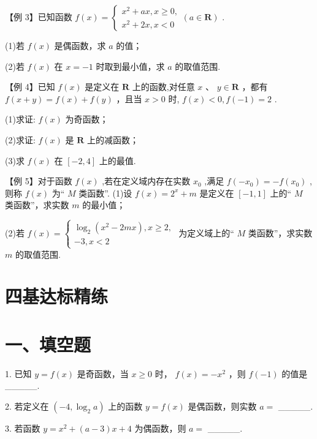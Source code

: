 【例 3】已知函数 $f\left( x\right)  = \left\{  {\begin{array}{l} {x}^{2} + {ax},x \geq  0, \\  {x}^{2} + {2x},x < 0 \end{array}\left( {a \in  \mathbf{R}}\right) }\right.$ .

(1)若 $f\left( x\right)$ 是偶函数，求 $a$ 的值；

(2)若 $f\left( x\right)$ 在 $x =  - 1$ 时取到最小值，求 $a$ 的取值范围.

【例 4】已知 $f\left( x\right)$ 是定义在 $\mathbf{R}$ 上的函数,对任意 $x$ 、 $y \in  \mathbf{R}$ ，都有 $f\left( {x + y}\right)  = f\left( x\right)  + f\left( y\right)$ ，且当 $x > 0$ 时, $f\left( x\right)  < 0,f\left( {-1}\right)  = 2$ .

(1)求证: $f\left( x\right)$ 为奇函数；

(2)求证: $f\left( x\right)$ 是 $\mathbf{R}$ 上的减函数；

(3)求 $f\left( x\right)$ 在 $\left\lbrack  {-2,4}\right\rbrack$ 上的最值.

【例 5】对于函数 $f\left( x\right)$ ,若在定义域内存在实数 ${x}_{0}$ ,满足 $f\left( {-{x}_{0}}\right)  =  - f\left( {x}_{0}\right)$ ,则称 $f\left( x\right)$ 为“ $M$ 类函数”. (1)设 $f\left( x\right)  = {2}^{x} + m$ 是定义在 $\left\lbrack  {-1,1}\right\rbrack$ 上的“ $M$ 类函数”，求实数 $m$ 的最小值；

(2)若 $f\left( x\right)  = \left\{  \begin{array}{l} {\log }_{2}\left( {{x}^{2} - {2mx}}\right) ,x \geq  2, \\   - 3,x < 2 \end{array}\right.$ 为定义域上的“ $M$ 类函数”，求实数 $m$ 的取值范围.

\section*{四基达标精练}

\section*{一、填空题}

1. 已知 $y = f\left( x\right)$ 是奇函数，当 $x \geq  0$ 时， $f\left( x\right)  =  - {x}^{2}$ ，则 $f\left( {-1}\right)$ 的值是\_\_\_\_\_.

2. 若定义在 $\left( {-4,{\log }_{2}a}\right)$ 上的函数 $y = f\left( x\right)$ 是偶函数，则实数 $a =$ \_\_\_\_\_.

3. 若函数 $y = {x}^{2} + \left( {a - 3}\right) x + 4$ 为偶函数，则 $a =$ \_\_\_\_\_.

